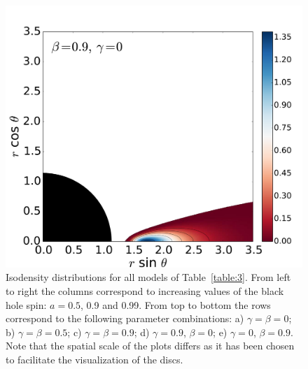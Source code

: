 \documentclass[]{aa}
\begin{document}
\begin{figure}
\includegraphics[scale=0.14]{figures/fig2_5_3.pdf}
\caption{Isodensity distributions for all models of Table~\ref{table:3}. From left to right the columns correspond to increasing values of the black hole spin: $a=0.5$, 0.9 and 0.99. From top to bottom the rows correspond to the following parameter combinations: a) $\gamma=\beta=0$; b) $\gamma=\beta=0.5$; c) $\gamma=\beta=0.9$; d) $\gamma=0.9$, $\beta=0$; e) $\gamma=0$, $\beta=0.9$. Note that the spatial scale of the plots differs as it has been chosen to facilitate the visualization of the discs.}
\label{models}
\end{figure}
\end{document}
